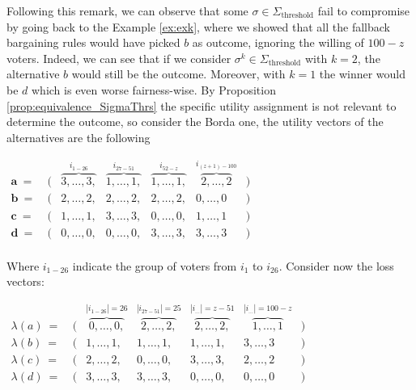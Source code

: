 \documentclass[version=3.21, pagesize, notitlepage, twoside=off, bibliography=totoc, DIV=calc, fontsize=12pt, a4paper]{scrartcl}
\newcommand{\SThreshold}{\Sigma_\text{threshold}}
\begin{document}
\begin{example}
	Following this remark, we can observe that some $\sigma \in \SThreshold$ fail to compromise by going back to the Example \ref{ex:exk}, where we showed that all the fallback bargaining rules would have picked $b$ as outcome, ignoring the willing of $100-z$ voters.
	Indeed, we can see that if we consider $\sigma^k \in \SThreshold$ with $k = 2$, the alternative $b$ would still be the outcome. Moreover, with $k=1$ the winner would be $d$ which is even worse fairness-wise. By Proposition \ref{prop:equivalence_SigmaThrs} the specific utility assignment is not relevant to determine the outcome, so consider the Borda one, the utility vectors of the alternatives are the following
	
	\begin{center}
		$
		\begin{array}{ccccccc}
		\mathbf{a} \ = \ &(& \overbrace{3, \dots,3,}^{i_{1-26}} & \overbrace{1, \dots, 1,}^{i_{27-51}} & \overbrace{1, \dots, 1,}^{i_{52-z}} & \overbrace{2, \dots, 2}^{i_{(z+1)-100}} &) \\
		\mathbf{b}\ = \ &(& 2, \dots,2, & 2, \dots, 2, & 2, \dots, 2, & 0, \dots, 0 &) \\
		\mathbf{c}\ = \ &(& 1, \dots,1, & 3, \dots, 3, & 0, \dots, 0, & 1, \dots, 1 &) \\
		\mathbf{d}\ = \ &(& 0, \dots,0, & 0, \dots, 0, & 3, \dots, 3, & 3, \dots, 3 &) \\
		\end{array}
		$
	\end{center}
	
	Where $i_{1-26}$ indicate the group of voters from $i_1$ to $i_{26}$. Consider now the loss vectors: 

	\begin{center}
		$
		\begin{array}{ccccccc}
		\lambda(a)\ = \ &(& \overbrace{0, \dots,0,}^{|i_{1-26}|=26} & \overbrace{2, \dots, 2,}^{|i_{27-51}|=25} & \overbrace{2, \dots, 2,}^{|i_{\dots}|=z-51} & \overbrace{1, \dots, 1}^{|i_{\dots}|=100-z} &) \\
		\lambda(b)\ = \ &(& 1, \dots,1, & 1, \dots, 1, & 1, \dots, 1, & 3, \dots, 3 &) \\
		\lambda(c)\ = \ &(& 2, \dots,2, & 0, \dots, 0, & 3, \dots, 3, & 2, \dots, 2 &) \\
		\lambda(d)\ = \ &(& 3, \dots,3, & 3, \dots, 3, & 0, \dots, 0, & 0, \dots, 0 &) \\
		\end{array}
		$
	\end{center}
	

\end{example}
\end{document}
